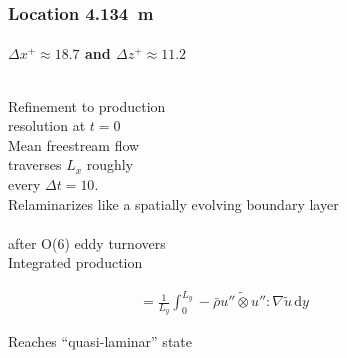 \documentclass[mathserif]{beamer}
\begin{document}
\begin{frame}
    \frametitle{Location 4.134~m}
    \framesubtitle{$\Delta{}x^{+}\approx{}18.7$ and $\Delta{}z^{+}\approx{}11.2$}
    \begin{columns}[c,onlytextwidth]
    \begin{column}{.35\linewidth}
        \scriptsize
        Refinement to production\\resolution at $t=0$
        \\\bigskip
        Mean freestream flow\\traverses $L_x$ roughly\\every $\Delta{}t=10$.
        \\\bigskip
        Relaminarizes like a spatially evolving boundary
        layer\\\citep{Cal2008Similarity}\\after O(6) eddy turnovers
        \\\bigskip
        Integrated production
        \vspace{-1em}
        \begin{tiny}
        \begin{align}
            \quad &= \frac{1}{L_y} \int_0^{L_y}
                - \bar{\rho} \widetilde{u''\otimes{}u''} : \nabla\tilde{u}
            \, \mathrm{d}y
        \end{align}
        \end{tiny}
        Reaches ``quasi-laminar'' state\\~\citep{Sreenivasan1982Laminarescent}
        \\\bigskip
    \end{column}
    \begin{column}{.65\linewidth}
        \vspace{-3.75em}
        \begin{flushright}

\end{flushright}
\end{column}
\end{columns}
\end{frame}
\end{document}
